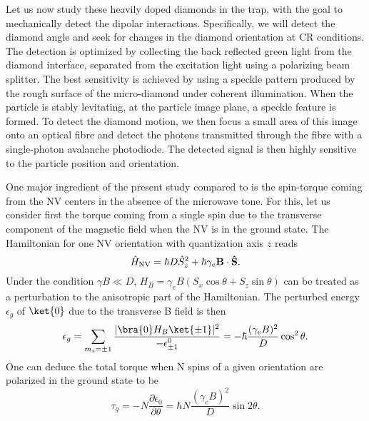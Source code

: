 \documentclass[preprintnumbers,amsmath,amssymb,superscriptaddress,twocolumn,showpacs]{revtex4-1}
\begin{document}
Let us now study these heavily doped diamonds in the trap, with the goal to mechanically detect the dipolar interactions.
Specifically, we will detect the diamond angle and seek for changes in the diamond orientation at CR conditions. The detection is optimized by collecting the back reflected green light from the diamond interface, separated from the excitation light using a polarizing beam splitter. The best sensitivity is achieved by using a speckle pattern produced by the rough surface of the micro-diamond under coherent illumination. When the particle is stably levitating, at the particle image plane, a speckle feature is formed. To detect the diamond motion, we then focus a small area of this image onto an optical fibre and detect the photons transmitted through the fibre with a single-photon avalanche photodiode. The detected signal is then highly sensitive to the particle position and orientation.


One major ingredient of the present study compared to \cite{DelordNat} is the spin-torque coming from the NV centers in the absence of the microwave tone.
For this, let us consider first the torque coming from a single spin due to the transverse component of the magnetic field when the NV is in the ground state.
The Hamiltonian for one NV orientation with quantization axis $z$ reads 
\begin{equation}\hat{H}_{\rm NV}=\hbar D \hat{S}_z^2+ \hbar \gamma_e \bf B  \cdot \bf\hat S.
\end{equation}
Under the condition $\gamma B \ll D$, $H_{B}= \gamma_e B  ( S_x \cos\theta + S_z \sin\theta)$ can be treated as a perturbation to the anisotropic part of the Hamiltonian. 
The perturbed energy $\epsilon_g$ of $\ket{0}$ due to the transverse B field is then
\begin{equation} \epsilon_g=\sum_{m_s=\pm 1}\frac{ |\bra{0} H_B \ket{\pm 1}|^2}{-\epsilon^0_{\pm 1}}=-\hbar\frac{(\gamma_e B)^2 }{D} \cos^2\theta.
\end{equation}
One can deduce the total torque when N spins of a given orientation are polarized in the ground state to be 
\begin{equation}\tau_g=-N \frac{\partial \epsilon_0}{\partial \theta}=\hbar N  \frac{(\gamma_e B)^2}{D} \sin 2\theta.\end{equation}
\end{document}
